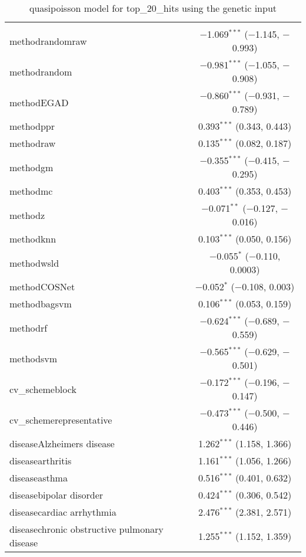 
\begin{table}[!htbp] \centering 
  \caption{quasipoisson model for top_20_hits using the genetic input} 
  \label{} 
\begin{tabular}{@{\extracolsep{5pt}}lc} 
\\[-1.8ex]\hline 
\hline \\[-1.8ex] 
 methodrandomraw & $-$1.069$^{***}$ ($-$1.145, $-$0.993) \\ 
  methodrandom & $-$0.981$^{***}$ ($-$1.055, $-$0.908) \\ 
  methodEGAD & $-$0.860$^{***}$ ($-$0.931, $-$0.789) \\ 
  methodppr & 0.393$^{***}$ (0.343, 0.443) \\ 
  methodraw & 0.135$^{***}$ (0.082, 0.187) \\ 
  methodgm & $-$0.355$^{***}$ ($-$0.415, $-$0.295) \\ 
  methodmc & 0.403$^{***}$ (0.353, 0.453) \\ 
  methodz & $-$0.071$^{**}$ ($-$0.127, $-$0.016) \\ 
  methodknn & 0.103$^{***}$ (0.050, 0.156) \\ 
  methodwsld & $-$0.055$^{*}$ ($-$0.110, 0.0003) \\ 
  methodCOSNet & $-$0.052$^{*}$ ($-$0.108, 0.003) \\ 
  methodbagsvm & 0.106$^{***}$ (0.053, 0.159) \\ 
  methodrf & $-$0.624$^{***}$ ($-$0.689, $-$0.559) \\ 
  methodsvm & $-$0.565$^{***}$ ($-$0.629, $-$0.501) \\ 
  cv\_schemeblock & $-$0.172$^{***}$ ($-$0.196, $-$0.147) \\ 
  cv\_schemerepresentative & $-$0.473$^{***}$ ($-$0.500, $-$0.446) \\ 
  diseaseAlzheimers disease & 1.262$^{***}$ (1.158, 1.366) \\ 
  diseasearthritis & 1.161$^{***}$ (1.056, 1.266) \\ 
  diseaseasthma & 0.516$^{***}$ (0.401, 0.632) \\ 
  diseasebipolar disorder & 0.424$^{***}$ (0.306, 0.542) \\ 
  diseasecardiac arrhythmia & 2.476$^{***}$ (2.381, 2.571) \\ 
  diseasechronic obstructive pulmonary disease & 1.255$^{***}$ (1.152, 1.359) \\ 

\end{tabular}
\end{table}
